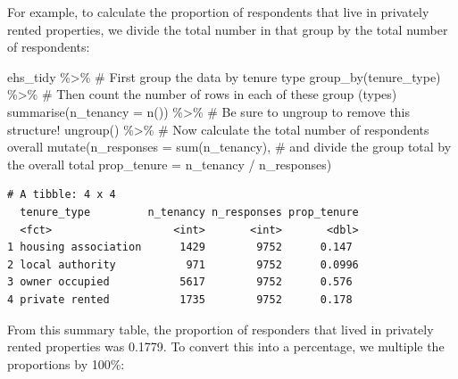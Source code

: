 \documentclass[
  letterpaper,
  DIV=11,
  numbers=noendperiod]{scrreprt}
\newenvironment{Shaded}{\begin{snugshade}}{\end{snugshade}}
\newcommand{\AttributeTok}[1]{\textcolor[rgb]{0.40,0.45,0.13}{#1}}
\newcommand{\CommentTok}[1]{\textcolor[rgb]{0.37,0.37,0.37}{#1}}
\newcommand{\FunctionTok}[1]{\textcolor[rgb]{0.28,0.35,0.67}{#1}}
\newcommand{\NormalTok}[1]{\textcolor[rgb]{0.00,0.23,0.31}{#1}}
\newcommand{\SpecialCharTok}[1]{\textcolor[rgb]{0.37,0.37,0.37}{#1}}
\begin{document}
For example, to calculate the proportion of respondents that live in
privately rented properties, we divide the total number in that group by
the total number of respondents:

\begin{Shaded}
\begin{Highlighting}[]
\NormalTok{ehs\_tidy }\SpecialCharTok{\%\textgreater{}\%} 
  \CommentTok{\# First group the data by tenure type}
  \FunctionTok{group\_by}\NormalTok{(tenure\_type) }\SpecialCharTok{\%\textgreater{}\%} 
  \CommentTok{\# Then count the number of rows in each of these group (types)}
  \FunctionTok{summarise}\NormalTok{(}\AttributeTok{n\_tenancy =} \FunctionTok{n}\NormalTok{()) }\SpecialCharTok{\%\textgreater{}\%} 
  \CommentTok{\# Be sure to ungroup to remove this structure!}
  \FunctionTok{ungroup}\NormalTok{() }\SpecialCharTok{\%\textgreater{}\%} 
  \CommentTok{\# Now calculate the total number of respondents overall }
  \FunctionTok{mutate}\NormalTok{(}\AttributeTok{n\_responses =} \FunctionTok{sum}\NormalTok{(n\_tenancy),}
  \CommentTok{\# and divide the group total by the overall total}
         \AttributeTok{prop\_tenure =}\NormalTok{ n\_tenancy }\SpecialCharTok{/}\NormalTok{ n\_responses)}
\end{Highlighting}
\end{Shaded}

\begin{verbatim}
# A tibble: 4 x 4
  tenure_type         n_tenancy n_responses prop_tenure
  <fct>                   <int>       <int>       <dbl>
1 housing association      1429        9752      0.147 
2 local authority           971        9752      0.0996
3 owner occupied           5617        9752      0.576 
4 private rented           1735        9752      0.178 
\end{verbatim}

From this summary table, the proportion of responders that lived in
privately rented properties was 0.1779. To convert this into a
percentage, we multiple the proportions by 100\%:
\end{document}
